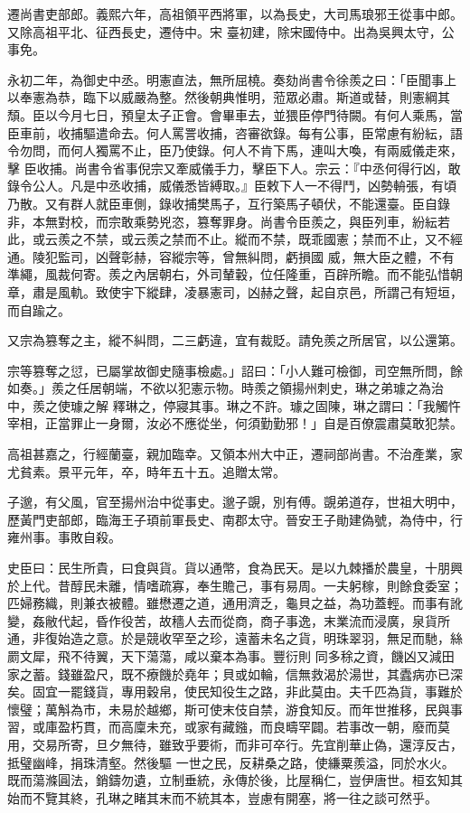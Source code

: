 \begin{pinyinscope}
 遷尚書吏部郎。義熙六年，高祖領平西將軍，以為長史，大司馬琅邪王從事中郎。又除高祖平北、征西長史，遷侍中。宋
 臺初建，除宋國侍中。出為吳興太守，公事免。



 永初二年，為御史中丞。明憲直法，無所屈橈。奏劾尚書令徐羨之曰：「臣聞事上以奉憲為恭，臨下以威嚴為整。然後朝典惟明，蒞眾必肅。斯道或替，則憲綱其頹。臣以今月七日，預皇太子正會。會畢車去，並猥臣停門待闕。有何人乘馬，當臣車前，收捕驅遣命去。何人罵詈收捕，咨審欲錄。每有公事，臣常慮有紛紜，語令勿問，而何人獨罵不止，臣乃使錄。何人不肯下馬，連叫大喚，有兩威儀走來，擊
 臣收捕。尚書令省事倪宗又牽威儀手力，擊臣下人。宗云：『中丞何得行凶，敢錄令公人。凡是中丞收捕，威儀悉皆縛取。』臣敕下人一不得鬥，凶勢輈張，有頃乃散。又有群人就臣車側，錄收捕樊馬子，互行築馬子頓伏，不能還臺。臣自錄非，本無對校，而宗敢乘勢兇恣，篡奪罪身。尚書令臣羨之，與臣列車，紛紜若此，或云羨之不禁，或云羨之禁而不止。縱而不禁，既乖國憲；禁而不止，又不經通。陵犯監司，凶聲彰赫，容縱宗等，曾無糾問，虧損國
 威，無大臣之體，不有準繩，風裁何寄。羨之內居朝右，外司輦轂，位任隆重，百辟所瞻。而不能弘惜朝章，肅是風軌。致使宇下縱肆，凌暴憲司，凶赫之聲，起自京邑，所謂己有短垣，而自踰之。



 又宗為篡奪之主，縱不糾問，二三虧違，宜有裁貶。請免羨之所居官，以公還第。



 宗等篡奪之愆，已屬掌故御史隨事檢處。」詔曰：「小人難可檢御，司空無所問，餘如奏。」羨之任居朝端，不欲以犯憲示物。時羨之領揚州刺史，琳之弟璩之為治中，羨之使璩之解
 釋琳之，停寢其事。琳之不許。璩之固陳，琳之謂曰：「我觸忤宰相，正當罪止一身爾，汝必不應從坐，何須勤勤邪！」自是百僚震肅莫敢犯禁。



 高祖甚嘉之，行經蘭臺，親加臨幸。又領本州大中正，遷祠部尚書。不治產業，家尤貧素。景平元年，卒，時年五十五。追贈太常。



 子邈，有父風，官至揚州治中從事史。邈子覬，別有傅。覬弟道存，世祖大明中，歷黃門吏部郎，臨海王子頊前軍長史、南郡太守。晉安王子勛建偽號，為侍中，行雍州事。事敗自殺。



 史臣曰：民生所貴，曰食與貨。貨以通幣，食為民天。是以九棘播於農皇，十朋興於上代。昔醇民未離，情嗜疏寡，奉生贍己，事有易周。一夫躬稼，則餘食委室；匹婦務織，則兼衣被體。雖懋遷之道，通用濟乏，龜貝之益，為功蓋輕。而事有訛變，姦敝代起，昏作役苦，故穡人去而從商，商子事逸，末業流而浸廣，泉貨所通，非復始造之意。於是競收罕至之珍，遠蓄未名之貨，明珠翠羽，無足而馳，絲罽文犀，飛不待翼，天下蕩蕩，咸以棄本為事。豐衍則
 同多稌之資，饑凶又減田家之蓄。錢雖盈尺，既不療饑於堯年；貝或如輪，信無救渴於湯世，其蠹病亦已深矣。固宜一罷錢貨，專用穀帛，使民知役生之路，非此莫由。夫千匹為貨，事難於懷璧；萬斛為市，未易於越鄉，斯可使末伎自禁，游食知反。而年世推移，民與事習，或庫盈朽貫，而高廩未充，或家有藏鏹，而良疇罕闢。若事改一朝，廢而莫用，交易所寄，旦夕無待，雖致乎要術，而非可卒行。先宜削華止偽，還淳反古，抵璧幽峰，捐珠清壑。然後驅
 一世之民，反耕桑之路，使縑粟羨溢，同於水火。既而蕩滌圓法，銷鑄勿遺，立制垂統，永傳於後，比屋稱仁，豈伊唐世。桓玄知其始而不覽其終，孔琳之睹其末而不統其本，豈慮有開塞，將一往之談可然乎。



\end{pinyinscope}